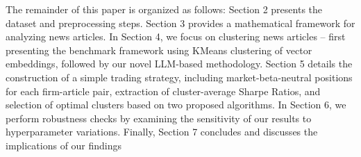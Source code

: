 The remainder of this paper is organized as follows: Section 2 presents the dataset and preprocessing steps. Section 3 provides a mathematical framework for analyzing news articles. In Section 4, we focus on clustering news articles -- first presenting the benchmark framework using KMeans clustering of vector embeddings, followed by our novel LLM-based methodology. Section 5 details the construction of a simple trading strategy, including market-beta-neutral positions for each firm-article pair, extraction of cluster-average Sharpe Ratios, and selection of optimal clusters based on two proposed algorithms. In Section 6, we perform robustness checks by examining the sensitivity of our results to hyperparameter variations. Finally, Section 7 concludes and discusses the implications of our findings






